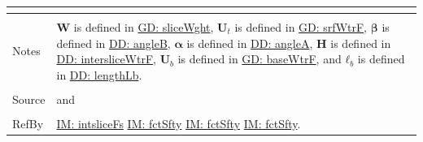 \documentclass[12pt]{article}
\begin{document}
\begin{minipage}{\textwidth}
\begin{tabular}{p{} p{}}
\begin{symbDescription}
              \end{symbDescription}
\\ \midrule \\
Notes & $\mathbf{W}$ is defined in \hyperref[GD:sliceWght]{GD: sliceWght}, ${\mathbf{U}_{t}}$ is defined in \hyperref[GD:srfWtrF]{GD: srfWtrF}, $\mathbf{β}$ is defined in \hyperref[DD:angleB]{DD: angleB}, $\mathbf{α}$ is defined in \hyperref[DD:angleA]{DD: angleA}, $\mathbf{H}$ is defined in \hyperref[DD:intersliceWtrF]{DD: intersliceWtrF}, ${\mathbf{U}_{b}}$ is defined in \hyperref[GD:baseWtrF]{GD: baseWtrF}, and ${\mathbf{ℓ}_{b}}$ is defined in \hyperref[DD:lengthLb]{DD: lengthLb}.
\\ \midrule \\
Source & \cite{chen2005} and \cite{karchewski2012}
\\ \midrule \\
RefBy & \hyperref[IM:intsliceFs]{IM: intsliceFs} \hyperref[IM:fctSfty]{IM: fctSfty} \hyperref[IM:fctSfty]{IM: fctSfty} \hyperref[IM:fctSfty]{IM: fctSfty}.
\\ \bottomrule \end{tabular}
\end{minipage}
\par~
\end{document}
